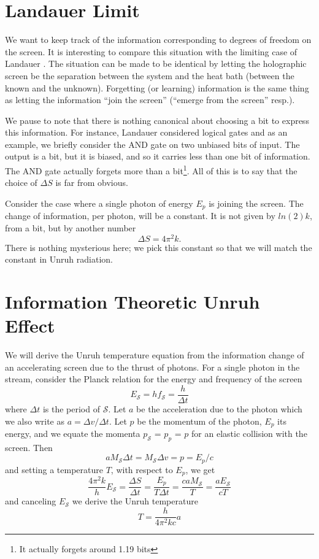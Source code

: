 \documentclass[12pt,a4paper]{article}
\begin{document}
\section{Landauer Limit}
We want to keep track of the information corresponding to degrees of freedom on the screen. It is interesting to compare this situation with the limiting case of Landauer \cite{landauer}.  The situation can be made to be identical by letting the holographic screen be the separation between the system and the heat bath (between the known and the unknown).  Forgetting (or learning) information is the same thing as letting the information ``join the screen'' (``emerge from the screen'' resp.).

We pause to note that there is nothing canonical about choosing a bit to express this information.  For instance, Landauer considered logical gates and as an example, we briefly consider the AND gate on two unbiased bits of input.  The output is a bit, but it is biased, and so it carries less than one bit of information.  The AND gate actually forgets more than a bit\footnote{It actually forgets around 1.19 bits}.  All of this is to say that the choice of $\Delta S$ is far from obvious.

Consider the case where a single photon of energy $E_p$ is joining the screen.  The change of information, per photon, will be a constant.  It is not given by $ln(2)k$, from a bit, but by another number
\[
  \Delta S = 4 \pi ^ 2 k.
\]
There is nothing mysterious here; we pick this constant so that we will match the constant in Unruh radiation.

\section{Information Theoretic Unruh Effect}

We will derive the Unruh temperature equation from the information change of an accelerating screen due to the thrust of photons. For a single photon in the stream, consider the Planck relation for the energy and frequency of the screen
\[
  E_\mathscr{S} = h f_\mathscr{S} = \frac{h}{\Delta t}
\]
where $\Delta t$ is the period of $\mathscr{S}$. Let $a$ be the acceleration due to the photon which we also write as $a = \Delta v / \Delta t$.  Let $p$ be the momentum of the photon, $E_p$ its energy, and we equate the momenta $p_\mathscr{S}$ = $p_p$ = $p$ for an elastic collision with the screen.  Then
\[
  a M_\mathscr{S} \Delta t = M_\mathscr{S}  \Delta v = p = E_p / c
  \]
and setting a temperature $T$, with respect to $E_p$, we get
\[
  \frac{4 \pi^2 k}{h} E_\mathscr{S} = \frac{\Delta S}{\Delta t} = \frac{E_p}{T \Delta t} = \frac{ca M_\mathscr{S}}{T} = \frac{aE_\mathscr{S}}{cT}
\]
and canceling $E_\mathscr{S}$ we derive the Unruh temperature \cite{unruh}
\[
T = \frac{h}{4\pi^2k c} a
\]
\end{document}
